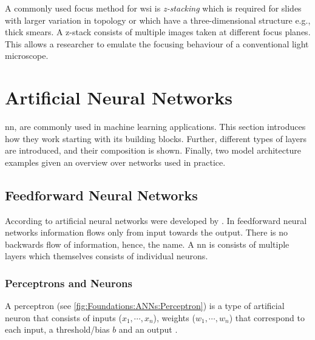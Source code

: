 A commonly used focus method for \ac{wsi} is \emph{z-stacking} \cite{el-gabry2014wholeslide} which is required for slides with larger variation in topology or which have a three-dimensional structure e.g., thick smears. A z-stack consists of multiple images taken at different focus planes. This allows a researcher to emulate the focusing behaviour of a conventional light microscope. 


\section{Artificial Neural Networks}
\label{sec:Foundations:NeuralNetworks}

\Acl{nn}, are commonly used in machine learning applications. This section introduces how they work starting with its building blocks. Further, different types of layers are introduced, and their composition is shown. Finally, two model architecture examples given an overview over networks used in practice.


\subsection{Feedforward Neural Networks}
\label{sec:Foundations:NeuralNetworks:FNN}

According to \textcite{nielsen2015neural} artificial neural networks were developed by \textcite{rosenblatt1958perceptron}. In feedforward neural networks information flows only from input towards the output. There is no backwards flow of information, hence, the name.
A \ac{nn} is consists of multiple layers which themselves consists of individual neurons.

\subsubsection{Perceptrons and Neurons}
\label{sec:Foundations:NeuralNetworks:Perceptrons}

A perceptron (see \autoref{fig:Foundations:ANNs:Perceptron}) is a type of artificial neuron that consists of inputs ($x_1, \cdots, x_n$), weights ($w_1, \cdots, w_n$) that correspond to each input, a threshold/bias $b$ and an output \cite{nielsen2015neural}.


